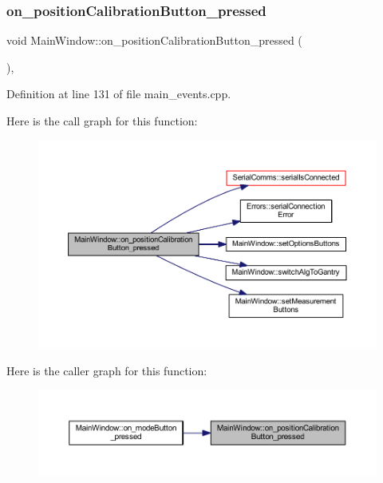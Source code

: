 \subsubsection{\texorpdfstring{on\_positionCalibrationButton\_pressed}{on\_positionCalibrationButton\_pressed}}
{\footnotesize\ttfamily void Main\+Window\+::on\+\_\+position\+Calibration\+Button\+\_\+pressed (\begin{DoxyParamCaption}{ }\end{DoxyParamCaption})\hspace{0.3cm}{\ttfamily [private]}, {\ttfamily [slot]}}



Definition at line 131 of file main\+\_\+events.\+cpp.

Here is the call graph for this function\+:
\nopagebreak
\begin{figure}[H]
\begin{center}
\leavevmode
\includegraphics[width=350pt]{class_main_window_ad8b394c839532c8b74fb8c7602d3da89_cgraph}
\end{center}
\end{figure}
Here is the caller graph for this function\+:
\nopagebreak
\begin{figure}[H]
\begin{center}
\leavevmode
\includegraphics[width=350pt]{class_main_window_ad8b394c839532c8b74fb8c7602d3da89_icgraph}
\end{center}
\end{figure}
\mbox{\label{class_main_window_a125980000dd5d0e94dfc612b0d911267}} 
